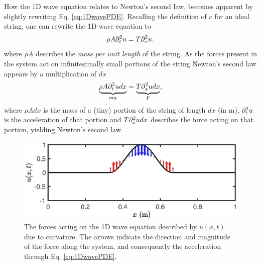 How the 1D wave equation relates to Newton's second law, becomes apparent by slightly rewriting Eq. \eqref{eq:1DwavePDE}. Recalling the definition of $c$ for an ideal string, one can rewrite the 1D wave equation to
\begin{equation*}
    \rho A \partial_t^2 u = T \partial_x^2 u,
\end{equation*}
where $\rho A$ describes the \textit{mass per unit length} of the string. As the forces present in the system act on infinitesimally small portions of the string Newton's second law appears by a multiplication of $dx$
\begin{equation*}
    \underbrace{\rho A \partial_t^2 u dx}_{ma} = \underbrace{T \partial_x^2 u dx}_{F},
\end{equation*}
where $\rho A dx$ is the mass of a (tiny) portion of the string of length $dx$ (in m), $\partial_t^2 u$ is the acceleration of that portion and $T \partial_x^2 u dx$ describes the force acting on that portion, yielding Newton's second law.  

\begin{figure}[h]
    \centering
    \includegraphics[width=\textwidth]{figures/fdtd/curvature.eps}
    \caption{\label{fig:curvature} The forces acting on the 1D wave equation described by $u(x,t)$ due to curvature. The arrows indicate the direction and magnitude of the force along the system, and consequently the acceleration through Eq. \eqref{eq:1DwavePDE}.}
\end{figure}

